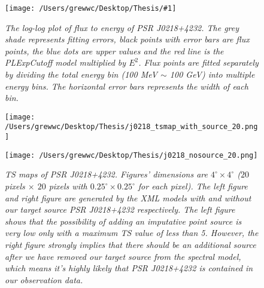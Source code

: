 \documentclass[12pt]{report}
\newcommand{\mycaption}[1]{\caption{\textit{\footnotesize #1}}}
\newcommand{\singleFig}[3]{
 \begin{figure}[!ht]
  \centering
  \texttt{[image: /Users/grewwc/Desktop/Thesis/\#1]}
  \mycaption{#3}
 \label{fig: #1}
 \end{figure}
}
\newcommand{\change}[1]{
  $<$\colorbox{red}{\textbf{change}}$>$#1$<$\colorbox{red}{\textbf{/change}}$>$
}
\begin{document}
            \singleFig{j0218_cur.png}{0.40}{
              The log-log plot of flux to energy of PSR J0218+4232. The grey shade represents 
              fitting errors, black points with error bars are flux points, the blue dots are upper values and the 
              red line is the PLExpCutoff model multiplied by $E^2$. Flux points 
              are fitted separately by dividing the total energy bin (100 MeV $\sim$ 100 GeV) into multiple energy bins.
              The horizontal error bars represents the width of each bin. \\
            }
            \vspace{1cm}
            \begin{figure}[!ht]
              \begin{center}
              \begin{minipage}{0.46\textwidth}
                \begin{center} 
                  \texttt{[image: /Users/grewwc/Desktop/Thesis/j0218\_tsmap\_with\_source\_20.png]}
                \end{center}
              \end{minipage}
              \begin{minipage}{0.45\textwidth}
                \begin{center}
                  \texttt{[image: /Users/grewwc/Desktop/Thesis/j0218\_nosource\_20.png]}
                \end{center}
              \end{minipage}
            \end{center}
            \mycaption{TS maps of PSR J0218+4232. Figures' dimensions are 
            $4^{\circ} \times 4^{\circ}$ ($20$ pixels $\times$ $20$ pixels with 
            $0.25^{\circ} \times 0.25^{\circ}$ for each pixel). The \textsf{left}
            figure and \textsf{right} figure are generated by the XML models with and without our 
            target source PSR J0218+4232 respectively. The \textsf{left} figure shows that the 
            possibility of adding an imputative point source is very low only with a maximum TS value of 
            less than 5. However, the \textsf{right} figure strongly implies that there should be an 
            additional source after we have removed our target source from the spectral model, 
            which means it's highly likely that PSR J0218+4232 is contained in our observation data.}
            \label{fig: j0218_tsmap_comparison_20}
            \end{figure}
\end{document}
